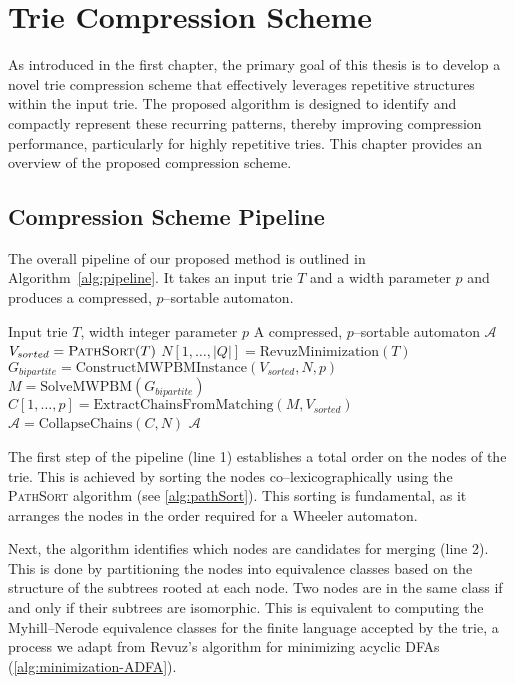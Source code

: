\chapter{Trie Compression Scheme} \label{chp:project_overview}
As introduced in the first chapter, the primary goal of this thesis is to develop a novel trie compression scheme that effectively leverages repetitive structures within the input trie. The proposed algorithm is designed to identify and compactly represent these recurring patterns, thereby improving compression performance, particularly for highly repetitive tries. This chapter provides an overview of the proposed compression scheme.

\section{Compression Scheme Pipeline}
The overall pipeline of our proposed method is outlined in Algorithm~\ref{alg:pipeline}. It takes an input trie $T$ and a width parameter $p$ and produces a compressed, $p$--sortable automaton.
\begin{algorithm}[H]
\caption{$\textsc{CompressTrie}(T,p)$}
\label{alg:pipeline}
\begin{algorithmic}[1]
\Require Input trie $T$, width integer parameter $p$
\Ensure A compressed, $p$--sortable automaton $\mathcal{A}$
    \State $V_{sorted} = \textsc{PathSort}(T)$ 
    \State $N[1,\dots,|Q|] = \text{RevuzMinimization}(T)$
    \State $G_{bipartite} = \text{ConstructMWPBMInstance}(V_{sorted}, N, p)$
    \State $M = \text{SolveMWPBM}(G_{bipartite})$ 
    \State $C[1,\dots,p] = \text{ExtractChainsFromMatching}(M, V_{sorted})$ 
    \State $\mathcal{A} = \text{CollapseChains}(C, N)$ 
    \State \Return $\mathcal{A}$
\end{algorithmic}
\end{algorithm}

The first step of the pipeline (line 1) establishes a total order on the nodes of the trie. This is achieved by sorting the nodes co--lexicographically using the \textsc{PathSort} algorithm (see \cref{alg:pathSort}). This sorting is fundamental, as it arranges the nodes in the order required for a Wheeler automaton.

Next, the algorithm identifies which nodes are candidates for merging (line 2). This is done by partitioning the nodes into equivalence classes based on the structure of the subtrees rooted at each node. Two nodes are in the same class if and only if their subtrees are isomorphic. This is equivalent to computing the Myhill--Nerode equivalence classes for the finite language accepted by the trie, a process we adapt from Revuz's algorithm for minimizing acyclic DFAs (\cref{alg:minimization-ADFA}).

